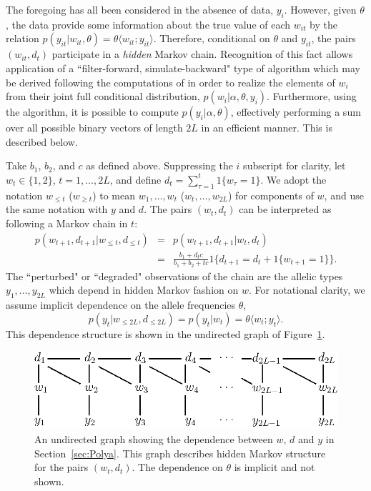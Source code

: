 \documentclass[11pt]{article}
\newcommand{\thetaof}[2]{\theta \langle #1;#2\rangle}
\begin{document}
The foregoing has all been considered in the absence of data, $y_i$. 
However, given $\theta$, the data provide some information about the true
value of each $w_{it}$ by the relation $ p(y_{it}|w_{it},\theta) =
\thetaof{w_{it}}{y_{it}}$.    Therefore, conditional on $\theta$
and $y_{it}$, the pairs $(w_{it},d_t)$ participate in a {\em hidden}
Markov chain. Recognition of this fact allows application of a
``filter-forward, simulate-backward" type of algorithm which may be derived following the  
computations of  in order to
realize the elements of $w_i$ from their joint full conditional
distribution, $p(w_i|\alpha, \theta, y_i)$.  Furthermore, using the
 algorithm, it is possible to compute
$p(y_i|\alpha,\theta)$, effectively performing a sum over all possible
binary vectors of length $2L$ in an efficient manner.  This is described below.

Take $b_1$, $b_2$, and $c$ as defined above.  Suppressing the $i$
subscript for clarity, let $w_t \in \{1,2\}$, $t=1,\ldots,2L$, and define
$d_t = \sum_{\tau=1}^t 1\{w_\tau = 1\}$.  We adopt the notation $w_{\leq
t}$ ($w_{\geq t}$) to mean $w_1,\ldots,w_{t}$ ($w_t,\ldots,w_{2L}$) for
 components of $w$, and use the same notation with $y$ and $d$.   The
pairs
$(w_t,d_t)$ can be interpreted as following a Markov chain in $t$:
\begin{eqnarray}
p(w_{t+1},d_{t+1} | w_{\leq t},d_{\leq t})& = &p(w_{t+1},d_{t+1} | w_{
t},d_{ t})  \nonumber \\
&=& 
\frac{b_1 + d_tc}{b_1+b_2+tc}
1\{d_{t+1} = d_t + 1\{w_{t+1} = 1\} \}\nonumber .
\end{eqnarray}
The ``perturbed" or ``degraded" observations of the chain are the allelic types 
$y_1,\ldots,y_{2L}$ which
depend in hidden Markov fashion on $w$.  For notational clarity, we assume
implicit dependence on the allele frequencies $\theta$,
\[
	p(y_t | w_{\leq 2L}, d_{\leq 2L}) = p(y_t | w_t) = \thetaof{w_t}{y_t}.
\]
This dependence structure is shown in the undirected graph of
Figure~\ref{fig:undirgraph}.
\begin{figure}
\begin{center}
\includegraphics*[width=.75\textwidth]{undirgraph.eps}
\caption{An undirected graph showing the dependence between $w$, $d$ and
$y$ in Section~\ref{sec:Polya}.  This graph describes hidden Markov structure
for the pairs $(w_t,d_t)$.  The dependence on $\theta$ is implicit
and not shown. }
\label{fig:undirgraph}
\end{center}
\end{figure}
\end{document}
